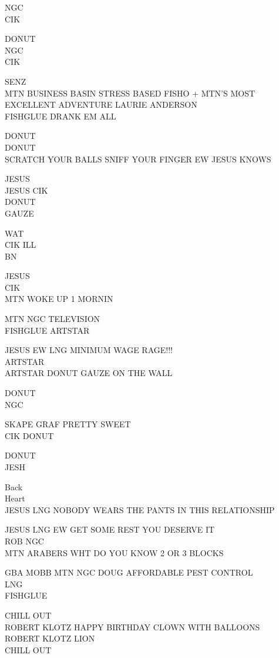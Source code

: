 \documentclass[10pt,letterpaper]{article}
\begin{document}
NGC\\
CIK

DONUT\\
NGC\\
CIK

SENZ\\
MTN BUSINESS BASIN STRESS BASED FISHO + MTN'S MOST EXCELLENT ADVENTURE LAURIE ANDERSON\\
FISHGLUE DRANK EM ALL

DONUT\\
DONUT\\
SCRATCH YOUR BALLS SNIFF YOUR FINGER EW JESUS KNOWS

JESUS\\
JESUS CIK\\
DONUT\\
GAUZE

WAT\\
CIK ILL\\
BN

JESUS\\
CIK\\
MTN WOKE UP 1 MORNIN

MTN NGC TELEVISION\\
FISHGLUE ARTSTAR

JESUS EW LNG MINIMUM WAGE RAGE!!!\\
ARTSTAR\\
ARTSTAR DONUT GAUZE ON THE WALL

DONUT\\
NGC

SKAPE GRAF PRETTY SWEET\\
CIK DONUT

DONUT\\
JESH

Back\\
Heart\\
JESUS LNG NOBODY WEARS THE PANTS IN THIS RELATIONSHIP

JESUS LNG EW GET SOME REST YOU DESERVE IT\\
ROB NGC\\
MTN ARABERS WHT DO YOU KNOW 2 OR 3 BLOCKS

GBA MOBB MTN NGC DOUG AFFORDABLE PEST CONTROL\\
LNG\\
FISHGLUE

CHILL OUT\\
ROBERT KLOTZ HAPPY BIRTHDAY CLOWN WITH BALLOONS\\
ROBERT KLOTZ LION\\
CHILL OUT
\end{document}
